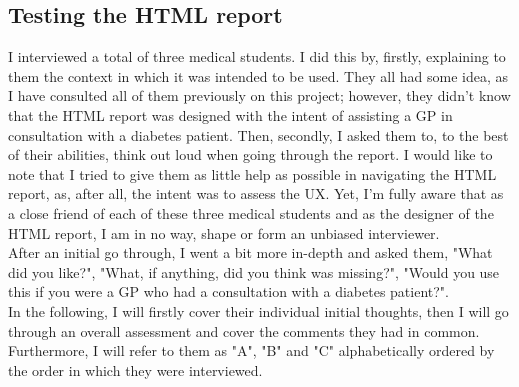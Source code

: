 \subsection{Testing the HTML report}
I interviewed a total of three medical students. I did this by, firstly, explaining to them the context in which it was intended to be used. They all had some idea, as I have consulted all of them previously on this project; however, they didn't know that the HTML report was designed with the intent of assisting a GP in consultation with a diabetes patient. Then, secondly, I asked them to, to the best of their abilities, think out loud when going through the report. I would like to note that I tried to give them as little help as possible in navigating the HTML report, as, after all, the intent was to assess the UX. Yet, I'm fully aware that as a close friend of each of these three medical students and as the designer of the HTML report, I am in no way, shape or form an unbiased interviewer. 
\\
After an initial go through, I went a bit more in-depth and asked them, "What did you like?", "What, if anything, did you think was missing?", "Would you use this if you were a GP who had a consultation with a diabetes patient?".
\\
In the following, I will firstly cover their individual initial thoughts, then I will go through an overall assessment and cover the comments they had in common. Furthermore, I will refer to them as "A", "B" and "C" alphabetically ordered by the order in which they were interviewed.


